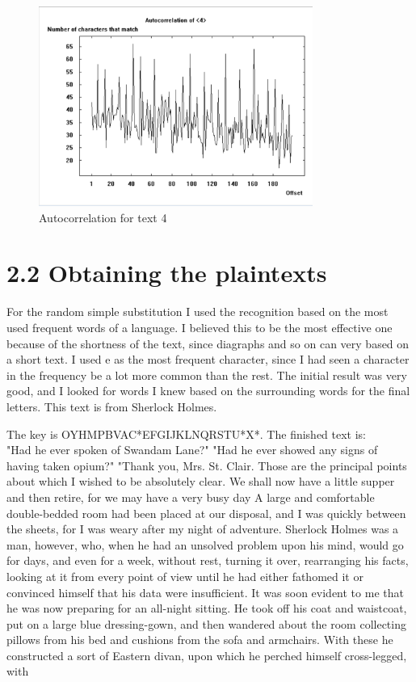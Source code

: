 \begin{figure}[ht!]
    \begin{center}
        \includegraphics[width=0.8\textwidth]{assets/4_autocorr.png}
        \caption{Autocorrelation for text 4}
        \label{fig:4autocorr}
    \end{center}
\end{figure}

\section*{2.2 Obtaining the plaintexts}

For the random simple substitution I used the recognition based on the most used frequent words of a language.
I believed this to be the most effective one because of the shortness of the text, since diagraphs and so on can very based on a short text.
I used e as the most frequent character, since I had seen a character in the frequency be a lot more common than the rest.
The initial result was very good, and I looked for words I knew based on the surrounding words for the final letters.
This text is from Sherlock Holmes.

The key is OYHMPBVAC*EFGIJKLNQRSTU*X*.
The finished text is: \\
"Had he ever spoken of Swandam Lane?"
"Had he ever showed any signs of having taken opium?"
"Thank you, Mrs. St. Clair. Those are the principal points about
which I wished to be absolutely clear. We shall now have a little
supper and then retire, for we may have a very busy day 
A large and comfortable double-bedded room had been placed at our
disposal, and I was quickly between the sheets, for I was weary
after my night of adventure. Sherlock Holmes was a man, however,
who, when he had an unsolved problem upon his mind, would go for
days, and even for a week, without rest, turning it over,
rearranging his facts, looking at it from every point of view
until he had either fathomed it or convinced himself that his
data were insufficient. It was soon evident to me that he was now
preparing for an all-night sitting. He took off his coat and
waistcoat, put on a large blue dressing-gown, and then wandered
about the room collecting pillows from his bed and cushions from
the sofa and armchairs. With these he constructed a sort of
Eastern divan, upon which he perched himself cross-legged, with



